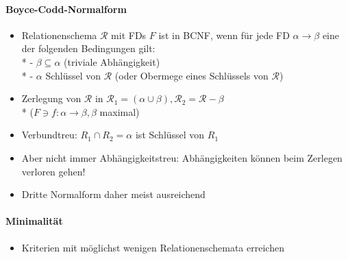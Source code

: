 \paragraph{Boyce-Codd-Normalform}
\begin{itemize}
	\item Relationenschema \( \mathcal{R} \) mit FDs \( F \) ist in BCNF, wenn für jede FD \( \alpha \to \beta \) eine der folgenden Bedingungen gilt: \\*
		- \( \beta \subseteq \alpha \) (triviale Abhängigkeit) \\*
		- \( \alpha \) Schlüssel von \( \mathcal{R} \) (oder Obermege eines Schlüssels von \( \mathcal{R} \))
	\item Zerlegung von \( \mathcal{R} \) in \( \mathcal{R}_{1} = (\alpha \cup \beta), \mathcal{R}_{2} = \mathcal{R}-\beta \) \\* (\( F \ni f : \alpha \to \beta, \beta \) maximal)
	\item Verbundtreu: $R_1 \cap R_2 = \alpha$ ist Schlüssel von $R_1$
	\item Aber nicht immer Abhängigkeitstreu: Abhängigkeiten können beim Zerlegen verloren gehen!
	\item Dritte Normalform daher meist ausreichend
\end{itemize}

\paragraph{Minimalität}
\begin{itemize}
	\item Kriterien mit möglichst wenigen Relationenschemata erreichen
\end{itemize}

